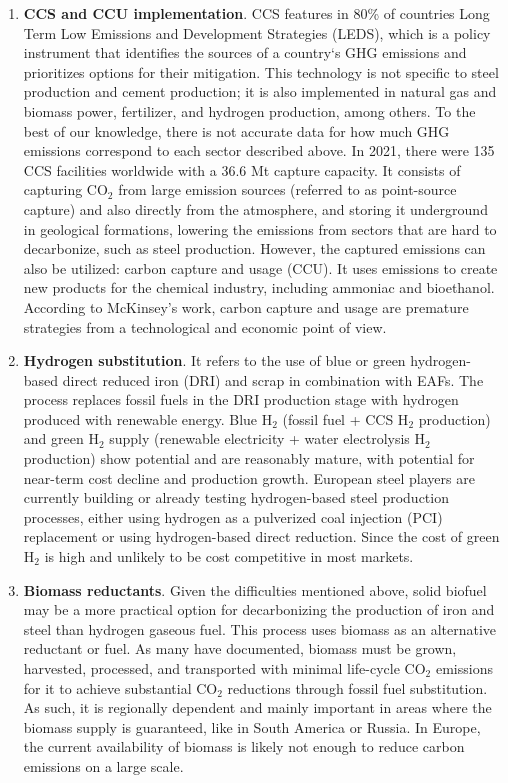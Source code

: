 \begin{enumerate}
\item \textbf{CCS and CCU implementation}. CCS features in 80\% of countries Long Term Low Emissions and Development Strategies (LEDS), which is a policy instrument that identifies the sources of a country‘s GHG emissions and prioritizes options for their mitigation.\autocite{clapp2010low} This technology is not specific to steel production and cement production; it is also implemented in natural gas and biomass power, fertilizer, and hydrogen production, among others. To the best of our knowledge, there is not accurate data for how much GHG emissions correspond to each sector described above. In 2021, there were 135 CCS facilities worldwide with a 36.6 Mt capture capacity.\autocite{global2021institute}  It consists of capturing CO$_2$ from large emission sources (referred to as point-source capture) and also directly from the atmosphere, and storing it underground in geological formations, lowering the emissions from sectors that are hard to decarbonize, such as steel production.\autocite{portner2022climate} However, the captured emissions can also be utilized: carbon capture and usage (CCU). It uses emissions to create new products for the chemical industry, including ammoniac and bioethanol. According to McKinsey's work,\autocite{hoffmann2021decarbonization} carbon capture and usage are premature strategies from a technological and economic point of view.
\item \textbf{Hydrogen substitution}. It refers to the use of blue or green hydrogen-based direct reduced iron (DRI) and scrap in combination with EAFs. The process replaces fossil fuels in the DRI production stage with hydrogen produced with renewable energy.\autocite{hoffmann2021decarbonization} Blue H$_2$ (fossil fuel + CCS H$_2$ production) and green H$_2$ supply (renewable electricity + water electrolysis H$_2$ production) show potential and are reasonably mature, with potential for near-term cost decline and production growth.\autocite{henderson2020blue}  European steel players are currently building or already testing hydrogen-based steel production processes, either using hydrogen as a pulverized coal injection (PCI) replacement or using hydrogen-based direct reduction.\autocite{hoffmann2021decarbonization} Since the cost of green H$_2$ is high and unlikely to be cost competitive in most markets.\autocite{fan2021low} 
\item \textbf{Biomass reductants}. Given the difficulties mentioned above, solid biofuel may be a more practical option for decarbonizing the production of iron and steel than hydrogen gaseous fuel.\autocite{fan2021low} This process uses biomass as an alternative reductant or fuel. As many have documented, biomass must be grown, harvested, processed, and transported with minimal life-cycle CO$_2$ emissions for it to achieve substantial CO$_2$ reductions through fossil fuel substitution.\autocite{langholtz20162016} As such, it is regionally dependent and mainly important in areas where the biomass supply is guaranteed, like in South America or Russia. In Europe, the current availability of biomass is likely not enough to reduce carbon emissions on a large scale.\autocite{hoffmann2021decarbonization}

\end{enumerate}
